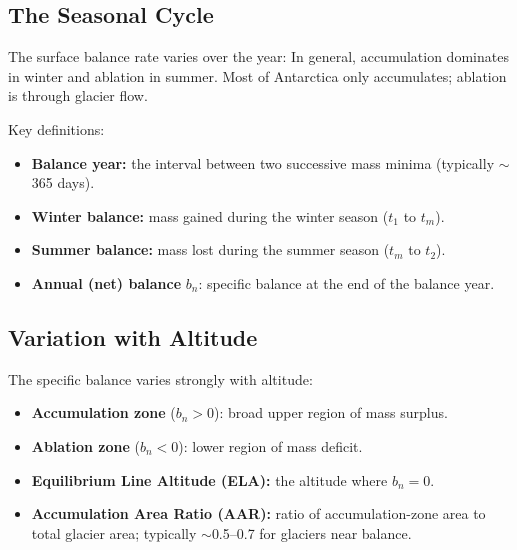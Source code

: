 \documentclass[11pt]{article}
\begin{document}
\subsection{The Seasonal Cycle}

The surface balance rate varies over the year: In general, accumulation dominates in winter and ablation in summer. Most of Antarctica only accumulates; ablation is through glacier flow.


Key definitions:
\begin{itemize}
  \item \textbf{Balance year:} the interval between two successive mass minima (typically $\sim$365 days).
  \item \textbf{Winter balance:} mass gained during the winter season ($t_1$ to $t_m$).
  \item \textbf{Summer balance:} mass lost during the summer season ($t_m$ to $t_2$).
  \item \textbf{Annual (net) balance} $b_n$: specific balance at the end of the balance year.
\end{itemize}

\subsection{Variation with Altitude}


The specific balance varies strongly with altitude:
\begin{itemize}
  \item \textbf{Accumulation zone} ($b_n > 0$): broad upper region of mass surplus.
  \item \textbf{Ablation zone} ($b_n < 0$): lower region of mass deficit.
  \item \textbf{Equilibrium Line Altitude (ELA):} the altitude where $b_n = 0$.
  \item \textbf{Accumulation Area Ratio (AAR):} ratio of accumulation-zone area to total glacier area; typically $\sim$0.5--0.7 for glaciers near balance.
\end{itemize}
\end{document}
